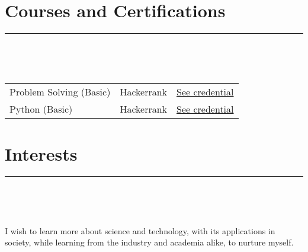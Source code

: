 \documentclass{article}
\begin{document}
\section*{Courses and Certifications} 
\hrule
\

\

\begin{tabular}{l l l}
    Problem Solving (Basic) & Hackerrank 
                            & \href{https://www.hackerrank.com/certificates/8d1db5b492de}{See credential} \\
    Python (Basic)  & Hackerrank 
                    & \href{https://www.hackerrank.com/certificates/46699d054d5a}{See credential} \\ 
\end{tabular}

\section*{Interests} 
\hrule
\

\

\noindent I wish to learn more about science and technology, with its applications in society, while learning from the industry and academia alike, to nurture myself.
\end{document}

